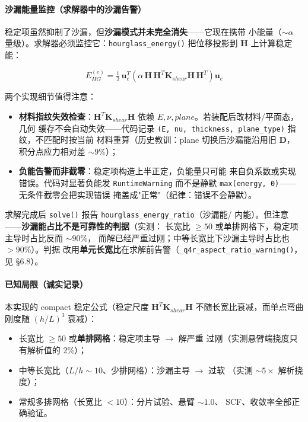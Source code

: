 \documentclass[12pt,a4paper]{ctexart}
\newcommand{\fem}{\Verb}
\begin{document}
\paragraph{沙漏能量监控（求解器中的沙漏告警）}

稳定项虽然抑制了沙漏，但\textbf{沙漏模式并未完全消失}——它现在携带
小能量（$\sim \alpha$ 量级）。求解器必须监控它：\fem|hourglass_energy()|
把位移投影到 $\mathbf{H}$ 上计算稳定能：

\begin{equation}
E_{HG}^{(e)} = \tfrac{1}{2}\, \mathbf{u}_e^T
\left( \alpha\, \mathbf{H}\,\mathbf{H}^T \mathbf{K}_{shear}
\mathbf{H}\,\mathbf{H}^T \right) \mathbf{u}_e
\end{equation}

两个实现细节值得注意：

\begin{itemize}[leftmargin=*]
  \item \textbf{材料指纹失效检查}：$\mathbf{H}^T \mathbf{K}_{shear}
        \mathbf{H}$ 依赖 $E,\nu,plane$。若装配后改材料/平面态，几何
        缓存不会自动失效——代码记录
        \fem|(E, nu, thickness, plane_type)| 指纹，不匹配时按当前
        材料重算（历史教训：plane 切换后沙漏能沿用旧 $\mathbf{D}$，
        积分点应力相对差 $\sim 9\%$）；
  \item \textbf{负能告警而非截零}：稳定项构造上半正定，负能量只可能
        来自负系数或实现错误。代码对显著负能发 \fem|RuntimeWarning|
        而不是静默 \fem|max(energy, 0)|——无条件截零会把实现错误
        掩盖成"正常"（纪律：错误不会静默）。
\end{itemize}

求解完成后 \fem|solve()| 报告 \fem|hourglass_energy_ratio|（沙漏能/
内能）。但注意——\textbf{沙漏能占比不是可靠性的判据}（实测：
长宽比 $\ge 50$ 或单排网格下，稳定项主导时占比反而 $\sim 90\%$，
而解已经严重过刚；中等长宽比下沙漏主导时占比也 $>90\%$）。判据
改用\textbf{单元长宽比}在求解前告警（\fem|_q4r_aspect_ratio_warning()|，
见 §6.8）。

\paragraph{已知局限（诚实记录）}

本实现的 compact 稳定公式（稳定尺度 $\mathbf{H}^T\mathbf{K}_{shear}
\mathbf{H}$ 不随长宽比衰减，而单点弯曲刚度随 $(h/L)^3$ 衰减）：

\begin{itemize}[leftmargin=*]
  \item 长宽比 $\ge 50$ 或\textbf{单排网格}：稳定项主导 $\to$ 解严重
        过刚（实测悬臂端挠度只有解析值的 2\%）；
  \item 中等长宽比（$L/h \sim 10$、少排网格）：沙漏主导 $\to$ 过软
        （实测 $\sim 5\times$ 解析挠度）；
  \item 常规多排网格（长宽比 $< 10$）：分片试验、悬臂 $\sim 1.0$、
        SCF、收敛率全部正确验证。
\end{itemize}
\end{document}
